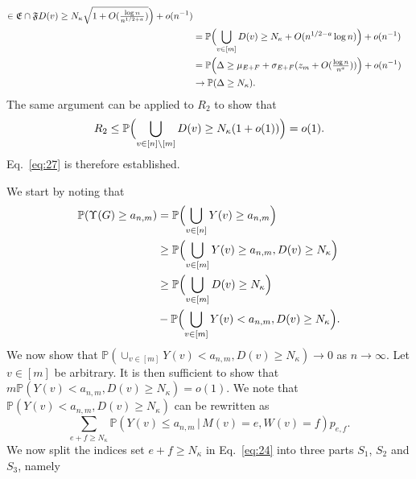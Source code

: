 \documentclass[10pt,journal,compsoc]{IEEEtran}
\theoremstyle{definition}
\begin{document}
\begin{IEEEproof}
\begin{IEEEproof}[Eq.~\eqref{eq:27}]
\begin{equation}
\begin{split}
{{        \in \mathfrak{E} \cap \mathfrak{F}}} D(v) \geq
    N_{\kappa} \sqrt{1 + O(\tfrac{\log{n}}{n^{1/2+a}})} \Bigr) + o(n^{-1}) \\
    & = \mathbb{P}\Bigl(\bigcup_{v \in [m]} D(v) \geq N_\kappa +
    O(n^{1/2 - a} \log{n})\Bigr) + o(n^{-1}) \\
    &= \mathbb{P}\Bigl(\Delta \geq \mu_{E+F} +
    \sigma_{E+F}(z_m + O(\tfrac{\log{n}}{n^{a}}))\Bigr) + o(n^{-1}) \\ 
    & \rightarrow \mathbb{P}(\Delta \geq N_{\kappa}).
    \end{split}
\end{equation}
The same argument can be applied to $R_2$ to show that
\begin{equation}
  \label{eq:38}
  R_2 \leq \mathbb{P}\Bigl(\bigcup_{v \in [n] \setminus [m]} D(v) \geq
  N_{\kappa}(1 + o(1))\Bigr) = o(1).
\end{equation}
Eq.~\eqref{eq:27} is therefore established.
\end{IEEEproof}
\begin{IEEEproof}[Eq.~\eqref{eq:30}]
  We start by noting that
  \begin{equation*}
    \begin{split}
      \mathbb{P}(\Upsilon(G) \geq a_{n,m}) &=
      \mathbb{P}\Bigl(\bigcup_{v \in [n]}Y(v) \geq
      a_{n,m}\Bigr) \\
      & \geq \mathbb{P}\Bigl(\bigcup_{v \in [m]}Y(v) \geq
      a_{n,m}, D(v) \geq N_\kappa \Bigr) \\
      & \geq \mathbb{P}\Bigl(\bigcup_{v \in [m]} D(v) \geq
      N_\kappa\Bigr) \\ &- \mathbb{P}\Bigl( \bigcup_{v
        \in [m]} Y(v) < a_{n,m}, D(v) \geq N_\kappa\Bigr).
    \end{split}
  \end{equation*}
  We now show that $\mathbb{P}( \cup_{v
        \in [m]} Y(v) < a_{n,m}, D(v) \geq N_\kappa) \rightarrow 0$ as
      $n \rightarrow \infty$. Let $v \in [m]$ be arbitrary. It is then
      sufficient to show that $m\mathbb{P}(Y(v) < a_{n,m}, D(v) \geq
      N_{\kappa}) = o(1)$. We note that $\mathbb{P}(Y(v) < a_{n,m}, D(v) \geq
      N_{\kappa})$ can be rewritten as
      \begin{equation}
        \label{eq:24}
        \sum_{e + f \geq N_{\kappa}}{\mathbb{P}(Y(v) \leq a_{n,m} \, |
          \, M(v) = e, W(v) =
          f)}p_{e,f}.
      \end{equation}
We now split the indices set $e + f \geq N_{\kappa}$ in
Eq.~\eqref{eq:24} into three parts $S_1$, $S_2$ and $S_3$, namely

\end{IEEEproof}
\end{IEEEproof}
\end{document}
